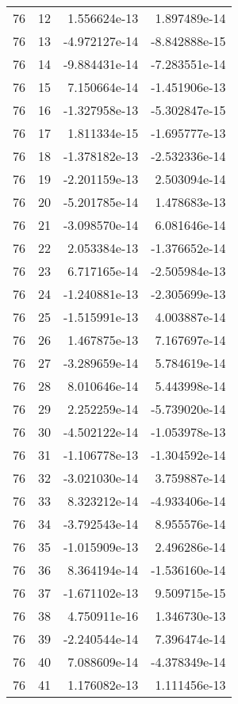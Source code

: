 \begin{tabular}{rrrr}
  76 &   12 &  1.556624e-13 &  1.897489e-14 \\
  76 &   13 & -4.972127e-14 & -8.842888e-15 \\
  76 &   14 & -9.884431e-14 & -7.283551e-14 \\
  76 &   15 &  7.150664e-14 & -1.451906e-13 \\
  76 &   16 & -1.327958e-13 & -5.302847e-15 \\
  76 &   17 &  1.811334e-15 & -1.695777e-13 \\
  76 &   18 & -1.378182e-13 & -2.532336e-14 \\
  76 &   19 & -2.201159e-13 &  2.503094e-14 \\
  76 &   20 & -5.201785e-14 &  1.478683e-13 \\
  76 &   21 & -3.098570e-14 &  6.081646e-14 \\
  76 &   22 &  2.053384e-13 & -1.376652e-14 \\
  76 &   23 &  6.717165e-14 & -2.505984e-13 \\
  76 &   24 & -1.240881e-13 & -2.305699e-13 \\
  76 &   25 & -1.515991e-13 &  4.003887e-14 \\
  76 &   26 &  1.467875e-13 &  7.167697e-14 \\
  76 &   27 & -3.289659e-14 &  5.784619e-14 \\
  76 &   28 &  8.010646e-14 &  5.443998e-14 \\
  76 &   29 &  2.252259e-14 & -5.739020e-14 \\
  76 &   30 & -4.502122e-14 & -1.053978e-13 \\
  76 &   31 & -1.106778e-13 & -1.304592e-14 \\
  76 &   32 & -3.021030e-14 &  3.759887e-14 \\
  76 &   33 &  8.323212e-14 & -4.933406e-14 \\
  76 &   34 & -3.792543e-14 &  8.955576e-14 \\
  76 &   35 & -1.015909e-13 &  2.496286e-14 \\
  76 &   36 &  8.364194e-14 & -1.536160e-14 \\
  76 &   37 & -1.671102e-13 &  9.509715e-15 \\
  76 &   38 &  4.750911e-16 &  1.346730e-13 \\
  76 &   39 & -2.240544e-14 &  7.396474e-14 \\
  76 &   40 &  7.088609e-14 & -4.378349e-14 \\
  76 &   41 &  1.176082e-13 &  1.111456e-13 \\

\end{tabular}

